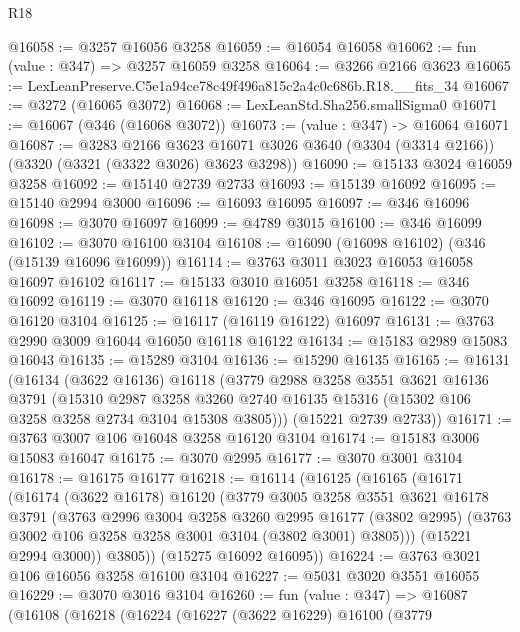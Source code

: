 \begin{lexlean}{R18}
\begin{coremodule}
@16058 := @3257 @16056 @3258
@16059 := @16054 @16058
@16062 := fun (value : @347) => @3257 @16059 @3258
@16064 := @3266 @2166 @3623
@16065 := LexLeanPreserve.C5e1a94ce78c49f496a815c2a4c0c686b.R18.__fits_34
@16067 := @3272 (@16065 @3072)
@16068 := LexLeanStd.Sha256.smallSigma0
@16071 := @16067 (@346 (@16068 @3072))
@16073 := (value : @347) -> @16064 @16071
@16087 := @3283
    @2166
    @3623
    @16071
    @3026
    @3640
    (@3304 (@3314 @2166))
    (@3320 (@3321 (@3322 @3026) @3623 @3298))
@16090 := @15133 @3024 @16059 @3258
@16092 := @15140 @2739 @2733
@16093 := @15139 @16092
@16095 := @15140 @2994 @3000
@16096 := @16093 @16095
@16097 := @346 @16096
@16098 := @3070 @16097
@16099 := @4789 @3015
@16100 := @346 @16099
@16102 := @3070 @16100 @3104
@16108 := @16090 (@16098 @16102) (@346 (@15139 @16096 @16099))
@16114 := @3763 @3011 @3023 @16053 @16058 @16097 @16102
@16117 := @15133 @3010 @16051 @3258
@16118 := @346 @16092
@16119 := @3070 @16118
@16120 := @346 @16095
@16122 := @3070 @16120 @3104
@16125 := @16117 (@16119 @16122) @16097
@16131 := @3763 @2990 @3009 @16044 @16050 @16118 @16122
@16134 := @15183 @2989 @15083 @16043
@16135 := @15289 @3104
@16136 := @15290 @16135
@16165 := @16131
    (@16134
      (@3622 @16136)
      @16118
      (@3779
        @2988
        @3258
        @3551
        @3621
        @16136
        @3791
        (@15310
          @2987
          @3258
          @3260
          @2740
          @16135
          @15316
          (@15302 @106 @3258 @3258 @2734 @3104 @15308 @3805)))
      (@15221 @2739 @2733))
@16171 := @3763 @3007 @106 @16048 @3258 @16120 @3104
@16174 := @15183 @3006 @15083 @16047
@16175 := @3070 @2995
@16177 := @3070 @3001 @3104
@16178 := @16175 @16177
@16218 := @16114
    (@16125
      (@16165
        (@16171
          (@16174
            (@3622 @16178)
            @16120
            (@3779
              @3005
              @3258
              @3551
              @3621
              @16178
              @3791
              (@3763
                @2996
                @3004
                @3258
                @3260
                @2995
                @16177
                (@3802 @2995)
                (@3763 @3002 @106 @3258 @3258 @3001 @3104 (@3802 @3001) @3805)))
            (@15221 @2994 @3000))
          @3805))
      (@15275 @16092 @16095))
@16224 := @3763 @3021 @106 @16056 @3258 @16100 @3104
@16227 := @5031 @3020 @3551 @16055
@16229 := @3070 @3016 @3104
@16260 := fun (value : @347) =>
  @16087
    (@16108
      (@16218
        (@16224
          (@16227
            (@3622 @16229)
            @16100
            (@3779

\end{coremodule}
\end{lexlean}
